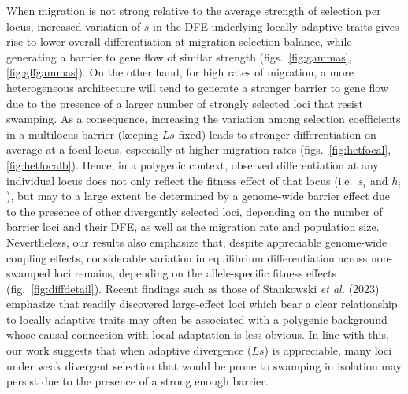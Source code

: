 \documentclass[
  11pt,
]{article}
\begin{document}
When migration is not strong relative to the average strength of
selection per locus, increased variation of \(s\) in the DFE underlying
locally adaptive traits gives rise to lower overall differentiation at
migration-selection balance, while generating a barrier to gene flow of
similar strength (figs.~\ref{fig:gammas}, \ref{fig:gffgammas}). On the
other hand, for high rates of migration, a more heterogeneous
architecture will tend to generate a stronger barrier to gene flow due
to the presence of a larger number of strongly selected loci that resist
swamping. As a consequence, increasing the variation among selection
coefficients in a multilocus barrier (keeping \(L\bar{s}\) fixed) leads
to stronger differentiation on average at a focal locus, especially at
higher migration rates (figs.~\ref{fig:hetfocal}, \ref{fig:hetfocalb}).
Hence, in a polygenic context, observed differentiation at any
individual locus does not only reflect the fitness effect of that locus
(i.e.~\(s_i\) and \(h_i\)), but may to a large extent be determined by a
genome-wide barrier effect due to the presence of other divergently
selected loci, depending on the number of barrier loci and their DFE, as
well as the migration rate and population size. Nevertheless, our
results also emphasize that, despite appreciable genome-wide coupling
effects, considerable variation in equilibrium differentiation across
non-swamped loci remains, depending on the allele-specific fitness
effects (fig.~\ref{fig:diffdetail}). Recent findings such as those of
Stankowski \emph{et al.} (2023) emphasize that readily discovered
large-effect loci which bear a clear relationship to locally adaptive
traits may often be associated with a polygenic background whose causal
connection with local adaptation is less obvious. In line with this, our
work suggests that when adaptive divergence (\(Ls\)) is appreciable,
many loci under weak divergent selection that would be prone to swamping
in isolation may persist due to the presence of a strong enough barrier.
\end{document}
